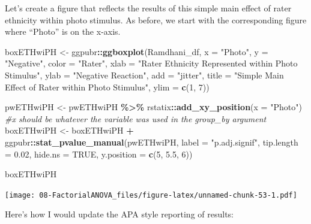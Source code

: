 \documentclass[
  11pt,
]{book}
\newenvironment{Shaded}{\begin{snugshade}}{\end{snugshade}}
\newcommand{\AttributeTok}[1]{\textcolor[rgb]{0.27,0.27,0.27}{#1}}
\newcommand{\CommentTok}[1]{\textcolor[rgb]{0.37,0.37,0.37}{\textit{#1}}}
\newcommand{\ConstantTok}[1]{\textcolor[rgb]{0.37,0.37,0.37}{#1}}
\newcommand{\DecValTok}[1]{\textcolor[rgb]{0.06,0.06,0.06}{#1}}
\newcommand{\FloatTok}[1]{\textcolor[rgb]{0.06,0.06,0.06}{#1}}
\newcommand{\FunctionTok}[1]{\textcolor[rgb]{0.27,0.27,0.27}{\textbf{#1}}}
\newcommand{\NormalTok}[1]{#1}
\newcommand{\OtherTok}[1]{\textcolor[rgb]{0.37,0.37,0.37}{#1}}
\newcommand{\SpecialCharTok}[1]{\textcolor[rgb]{0.43,0.43,0.43}{\textbf{#1}}}
\newcommand{\StringTok}[1]{\textcolor[rgb]{0.5,0.5,0.5}{#1}}
\begin{document}
Let's create a figure that reflects the results of this simple main effect of rater ethnicity within photo stimulus. As before, we start with the corresponding figure where ``Photo'' is on the x-axis.

\begin{Shaded}
\begin{Highlighting}[]
\NormalTok{boxETHwiPH }\OtherTok{\textless{}{-}}\NormalTok{ ggpubr}\SpecialCharTok{::}\FunctionTok{ggboxplot}\NormalTok{(Ramdhani\_df, }\AttributeTok{x =} \StringTok{"Photo"}\NormalTok{, }\AttributeTok{y =} \StringTok{"Negative"}\NormalTok{,}
    \AttributeTok{color =} \StringTok{"Rater"}\NormalTok{, }\AttributeTok{xlab =} \StringTok{"Rater Ethnicity Represented within Photo Stimulus"}\NormalTok{,}
    \AttributeTok{ylab =} \StringTok{"Negative Reaction"}\NormalTok{, }\AttributeTok{add =} \StringTok{"jitter"}\NormalTok{, }\AttributeTok{title =} \StringTok{"Simple Main Effect of Rater within Photo Stimulus"}\NormalTok{,}
    \AttributeTok{ylim =} \FunctionTok{c}\NormalTok{(}\DecValTok{1}\NormalTok{, }\DecValTok{7}\NormalTok{))}

\NormalTok{pwETHwiPH }\OtherTok{\textless{}{-}}\NormalTok{ pwETHwiPH }\SpecialCharTok{\%\textgreater{}\%}
\NormalTok{    rstatix}\SpecialCharTok{::}\FunctionTok{add\_xy\_position}\NormalTok{(}\AttributeTok{x =} \StringTok{"Photo"}\NormalTok{)  }\CommentTok{\#x should be whatever the variable was used in the group\_by argument }
\NormalTok{boxETHwiPH }\OtherTok{\textless{}{-}}\NormalTok{ boxETHwiPH }\SpecialCharTok{+}\NormalTok{ ggpubr}\SpecialCharTok{::}\FunctionTok{stat\_pvalue\_manual}\NormalTok{(pwETHwiPH, }\AttributeTok{label =} \StringTok{"p.adj.signif"}\NormalTok{,}
    \AttributeTok{tip.length =} \FloatTok{0.02}\NormalTok{, }\AttributeTok{hide.ns =} \ConstantTok{TRUE}\NormalTok{, }\AttributeTok{y.position =} \FunctionTok{c}\NormalTok{(}\DecValTok{5}\NormalTok{, }\FloatTok{5.5}\NormalTok{, }\DecValTok{6}\NormalTok{))}

\NormalTok{boxETHwiPH}
\end{Highlighting}
\end{Shaded}

\texttt{[image: 08-FactorialANOVA\_files/figure-latex/unnamed-chunk-53-1.pdf]}

Here's how I would update the APA style reporting of results:
\end{document}
